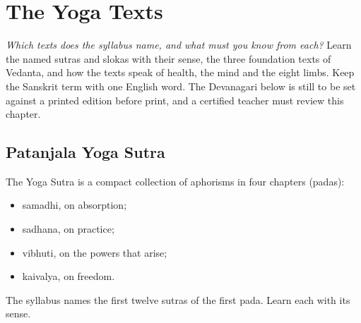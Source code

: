\chapter{The Yoga Texts}
\label{ch:texts}

\emph{Which texts does the syllabus name, and what must you know from each?}
Learn the named sutras and slokas with their sense, the three foundation texts of Vedanta, and how the texts speak of health, the mind and the eight limbs.
Keep the Sanskrit term with one English word. The Devanagari below is still to be set against a printed edition before print, and a certified teacher must review this chapter.

\section{Patanjala Yoga Sutra}
\label{sec:patanjala-yoga-sutra}

The Yoga Sutra is a compact collection of aphorisms in four chapters (padas):
\begin{itemize}
\item samadhi, on absorption;
\item sadhana, on practice;
\item vibhuti, on the powers that arise;
\item kaivalya, on freedom.
\end{itemize}
The syllabus names the first twelve sutras of the first pada. Learn each with its sense.

